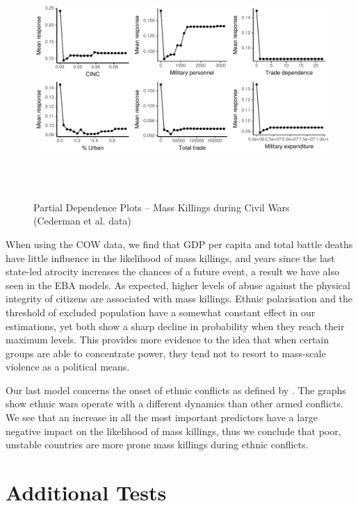 \begin{figure}[h!]
\begin{center}
\includegraphics[width=\textwidth, height=9cm]{images/drfdpp4.pdf}
\caption{ Partial Dependence Plots -- Mass Killings during Civil Wars (Cederman et al. data)}
\label{fig:drfdpp4}
\end{center}
\end{figure}

\newpage

When using the COW data, we find that GDP per capita and total battle deaths have little influence in the likelihood of mass killings, and years since the last state-led atrocity increases the chances of a future event, a result we have also seen in the EBA models. As expected, higher levels of abuse against the physical integrity of citizens are associated with mass killings. Ethnic polarisation and the threshold of excluded population have a somewhat constant effect in our estimations, yet both show a sharp decline in probability when they reach their maximum levels. This provides more evidence to the idea that when certain groups are able to concentrate power, they tend not to resort to mass-scale violence as a political means.

Our last model concerns the onset of ethnic conflicts as defined by \citet{cederman2010ethnic}. The graphs show ethnic wars operate with a different dynamics than other armed conflicts. We see that an increase in all the most important predictors have a large negative impact on the likelihood of mass killings, thus we conclude that poor, unstable countries are more prone mass killings during ethnic conflicts.

\section{Additional Tests}
\label{sec:additional-tests4}

